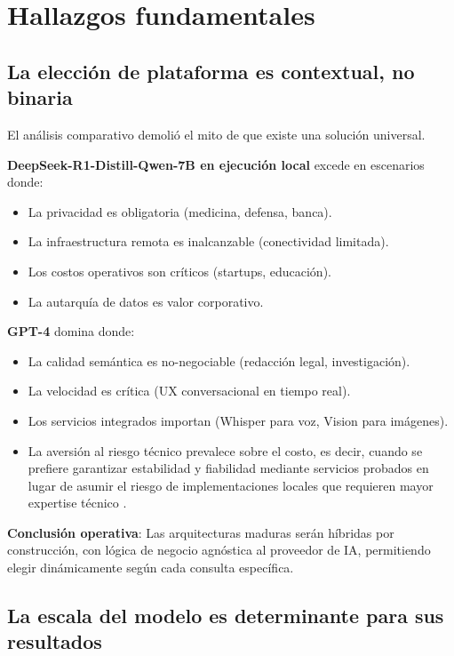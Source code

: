 \documentclass[12pt,a4paper]{report}
\numberwithin{figure}{section}
\begin{document}
\vspace{1em}

\section{Hallazgos fundamentales}
\label{sec:hallazgos_fundamentales}

\subsection{La elección de plataforma es contextual, no binaria}

El análisis comparativo demolió el mito de que existe una solución universal. 

\textbf{DeepSeek-R1-Distill-Qwen-7B en ejecución local} excede en escenarios donde:
\begin{itemize}
    \item[(a)] La privacidad es obligatoria (medicina, defensa, banca).
    \item[(b)] La infraestructura remota es inalcanzable (conectividad limitada).
    \item[(c)] Los costos operativos son críticos (startups, educación).
    \item[(d)] La autarquía de datos es valor corporativo.
\end{itemize}

\textbf{GPT-4} domina donde:
\begin{itemize}
    \item[(a)] La calidad semántica es no-negociable (redacción legal, investigación).
    \item[(b)] La velocidad es crítica (UX conversacional en tiempo real).
    \item[(c)] Los servicios integrados importan (Whisper para voz, Vision para imágenes).
    \item[(d)] La aversión al riesgo técnico prevalece sobre el costo, es decir, cuando se prefiere garantizar estabilidad y fiabilidad mediante servicios probados en lugar de asumir el riesgo de implementaciones locales que requieren mayor expertise técnico .
\end{itemize}

\textbf{Conclusión operativa}: Las arquitecturas maduras serán híbridas por construcción, con lógica de negocio agnóstica al proveedor de IA, permitiendo elegir dinámicamente según cada consulta específica.

\subsection{La escala del modelo es determinante para sus resultados}
\end{document}
